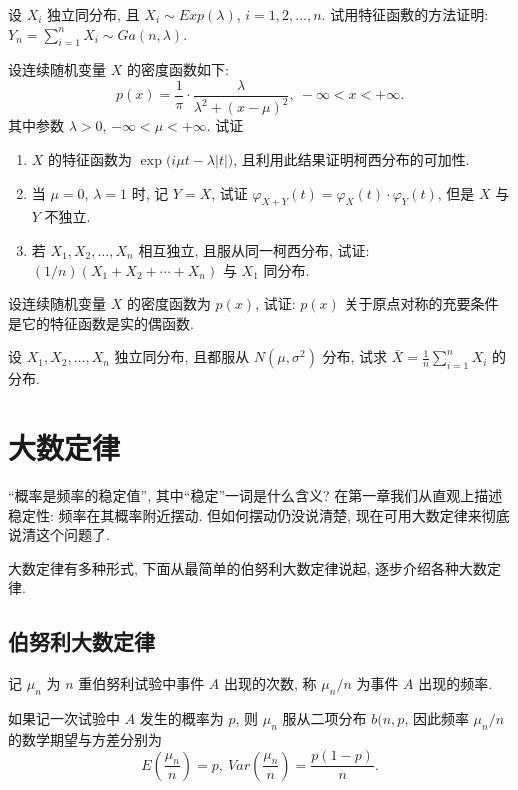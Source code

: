 \begin{xiti}
    \item 设 $ X_i $ 独立同分布, 且 $ X_i \sim Exp ( \lambda ) $, $ i = 1,2,\dotsc,n $. 试用特征函敷的方法证明: $ Y_n = \sum_{i=1}^n X_i \sim Ga ( n, \lambda ) $.
    \item 设连续随机变量 $ X $ 的密度函数如下:
    \begin{equation*}
        p (x) = \frac{1}{\pi} \cdot \frac{\lambda}{\lambda^2 + ( x - \mu )^2}, \ -\infty < x < +\infty.
    \end{equation*}
    其中参数 $ \lambda > 0 $, $ -\infty < \mu < +\infty $. 试证
    \begin{enumerate}
        \item $ X $ 的特征函数为 $ \exp \bigl( i\mu t - \lambda \lvert t \rvert \bigr) $, 且利用此结果证明柯西分布的可加性.
        \item 当 $ \mu = 0 $, $ \lambda = 1 $ 时, 记 $ Y = X $, 试证 $ \varphi_{X + Y} (t) = \varphi_X (t) \cdot \varphi_Y (t) $, 但是 $ X $ 与 $ Y $ 不独立.
        \item 若 $ X_1, X_2, \dotsc, X_n $ 相互独立, 且服从同一柯西分布, 试证: $ (1/n) ( X_1 + X_2 + \dotsb + X_n ) $ 与 $ X_1 $ 同分布.
    \end{enumerate}
    \item 设连续随机变量 $ X $ 的密度函数为 $ p (x) $, 试证: $ p (x) $ 关于原点对称的充要条件是它的特征函数是实的偶函数.
    \item 设 $ X_1, X_2, \dotsc, X_n $ 独立同分布, 且都服从 $ N (\mu, \sigma^2) $ 分布, 试求 $ \bar{X} = \frac{1}{n} \sum_{i=1}^n X_i $ 的分布.
\end{xiti}

\section{大数定律}

``概率是频率的稳定值'', 其中``稳定''一词是什么含义?
在第一章我们从直观上描述稳定性: 频率在其概率附近摆动.
但如何摆动仍没说清楚, 现在可用大数定律来彻底说清这个问题了.

大数定律有多种形式, 下面从最简单的伯努利大数定律说起, 逐步介绍各种大数定律.

\subsection{伯努利大数定律}

记 $ \mu_n $ 为 $ n $ 重伯努利试验中事件 $ A $ 出现的次数, 称 $ \mu_n / n $ 为事件 $ A $ 出现的频率.

如果记一次试验中 $ A $ 发生的概率为 $ p $, 则 $ \mu_n $ 服从二项分布 $ b (n, p $, 因此频率 $ \mu_n / n $ 的数学期望与方差分别为
\begin{equation}\label{eq:4.2.1}
    E \left( \frac{\mu_n}{n} \right) = p, \ Var \left( \frac{\mu_n}{n} \right) = \frac{p ( 1 - p )}{n}.
\end{equation}


